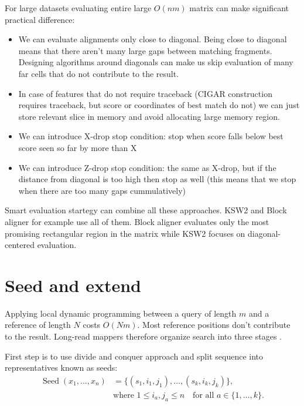 For large datasets evaluating entire large \(O(nm)\) matrix can make significant practical difference:
\begin{itemize}
    \item We can evaluate alignments only close to diagonal. Being close to diagonal means that there aren't many large gaps between matching fragments. Designing algorithms around diagonals can make us skip evaluation of many far cells that do not contribute to the result.
    \item In case of features that do not require traceback (CIGAR construction requires traceback, but score or coordinates of best match do not) we can just store relevant slice in memory and avoid allocating large memory region.
    \item We can introduce X-drop stop condition: stop when score falls below best score seen so far by more than X
    \item We can introduce Z-drop stop condition: the same as X-drop, but if the distance from diagonal is too high then stop as well (this means that we stop when there are too many gaps cummulatively)
\label{lst:xdrop-zdrop-strategies}
\end{itemize}

Smart evaluation startegy can combine all these approaches. KSW2 and Block aligner for example use all of them. Block aligner \cite{block_aligner_paper} evaluates only the most promising rectangular region in the matrix while KSW2 \cite{suzuki_kasahara_2018} focuses on diagonal-centered evaluation.

\section{Seed and extend}
\label{sec:seed-chain-extend}

Applying local dynamic programming between a query of length \(m\) and a
reference of length \(N\) costs \(O(Nm)\). Most reference positions don't contribute to the result. Long-read mappers therefore organize search into
three stages \cite{minimap2_paper}.

First step is to use divide and conquer approach and split sequence into representatives known as seeds:
\begin{equation}
\begin{aligned}
  \operatorname{Seed}(x_1,\ldots,x_n)
    &= \bigl\{(s_1,i_1,j_1),\ldots,(s_k,i_k,j_k)\bigr\},\\
    &\text{where }1\leq i_a,j_a\leq n
      \quad\text{for all }a\in\{1,\ldots,k\}.
\end{aligned}
\label{eq:seeding-def}
\end{equation}


